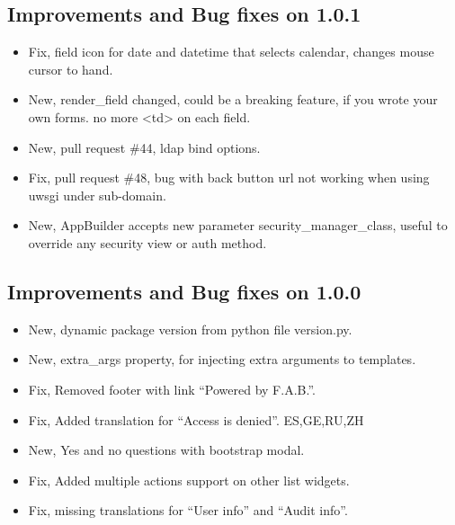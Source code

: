 \documentclass[letterpaper,10pt,english]{sphinxmanual}
\begin{document}
\subsection{Improvements and Bug fixes on 1.0.1}
\label{versions:improvements-and-bug-fixes-on-1-0-1}\begin{itemize}
\item {} 
Fix, field icon for date and datetime that selects calendar, changes mouse cursor to hand.

\item {} 
New, render\_field changed, could be a breaking feature, if you wrote your own forms. no more \textless{}td\textgreater{} on each field.

\item {} 
New, pull request \#44, ldap bind options.

\item {} 
Fix, pull request \#48, bug with back button url not working when using uwsgi under sub-domain.

\item {} 
New, AppBuilder accepts new parameter security\_manager\_class, useful to override any security view or auth method.

\end{itemize}


\subsection{Improvements and Bug fixes on 1.0.0}
\label{versions:improvements-and-bug-fixes-on-1-0-0}\begin{itemize}
\item {} 
New, dynamic package version from python file version.py.

\item {} 
New, extra\_args property, for injecting extra arguments to templates.

\item {} 
Fix, Removed footer with link ``Powered by F.A.B.''.

\item {} 
Fix, Added translation for ``Access is denied''. ES,GE,RU,ZH

\item {} 
New, Yes and no questions with bootstrap modal.

\item {} 
Fix, Added multiple actions support on other list widgets.

\item {} 
Fix, missing translations for ``User info'' and ``Audit info''.

\end{itemize}
\end{document}
